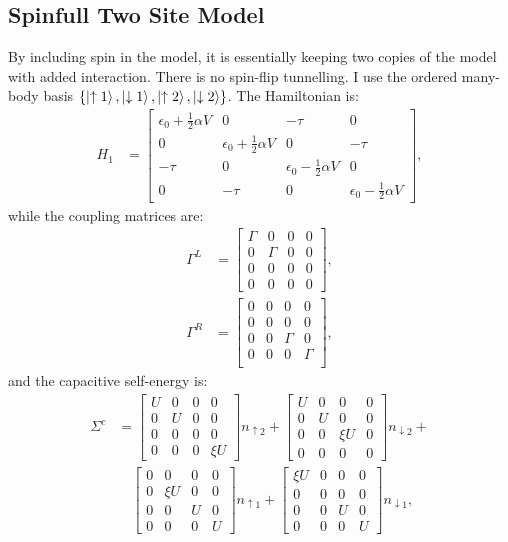 \subsection{Spinfull Two Site Model}
By including spin in the model, it is essentially keeping two copies of the model with added interaction. There is no spin-flip tunnelling. I use the ordered many-body basis $\left\{ \ket{\uparrow 1}, \ket{\downarrow 1}, \ket{\uparrow 2}, \ket{\downarrow 2}\right\}$. The Hamiltonian is:
\begin{align}
H_1 &= \begin{bmatrix} \epsilon_0 + \frac{1}{2} \alpha V & 0 & -\tau & 0 \\ 0 & \epsilon_0 + \frac{1}{2} \alpha V & 0 & -\tau\\ -\tau & 0 & \epsilon_0 - \frac{1}{2} \alpha V & 0 \\ 0 & -\tau & 0 & \epsilon_0 - \frac{1}{2} \alpha V\end{bmatrix},
\label{eq:spinfullhamiltonian}
\end{align} 
while the coupling matrices are:
\begin{align*}
\Gamma^L &= \begin{bmatrix} \Gamma & 0 & 0 & 0 \\ 0 & \Gamma & 0 & 0 \\ 0 & 0 & 0 & 0 \\  0 & 0 & 0 & 0\end{bmatrix},\\ \Gamma^R &= \begin{bmatrix} 0 & 0 & 0 & 0 \\ 0 & 0 & 0 & 0 \\ 0 & 0 & \Gamma & 0 \\ 0 & 0 & 0 & \Gamma \\ \end{bmatrix},
\end{align*}
and the capacitive self-energy is:
\begin{align*}
\Sigma^c &= \begin{bmatrix} U & 0 & 0 & 0\\ 0 & U & 0 & 0\\ 0 & 0 & 0 & 0\\ 0 & 0 & 0 & \xi U \end{bmatrix} n_{\uparrow 2} + \begin{bmatrix} U & 0 & 0 & 0\\ 0 & U & 0 & 0\\ 0 & 0 & \xi U & 0\\ 0 & 0 & 0 & 0 \end{bmatrix} n_{\downarrow 2} +\\
&\quad\begin{bmatrix} 0 & 0 & 0 & 0\\ 0 & \xi  U & 0 & 0\\ 0 & 0 & U & 0\\ 0 & 0 & 0 & U \end{bmatrix} n_{\uparrow 1} + \begin{bmatrix} \xi  U & 0 & 0 & 0\\ 0 & 0 & 0 & 0\\ 0 & 0 & U & 0\\ 0 & 0 & 0 & U \end{bmatrix} n_{\downarrow 1},
\end{align*}
